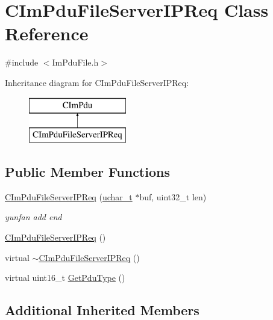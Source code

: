 \hypertarget{class_c_im_pdu_file_server_i_p_req}{}\section{C\+Im\+Pdu\+File\+Server\+I\+P\+Req Class Reference}
\label{class_c_im_pdu_file_server_i_p_req}


{\ttfamily \#include $<$Im\+Pdu\+File.\+h$>$}

Inheritance diagram for C\+Im\+Pdu\+File\+Server\+I\+P\+Req\+:\begin{figure}[H]
\begin{center}
\leavevmode
\includegraphics[height=2.000000cm]{class_c_im_pdu_file_server_i_p_req}
\end{center}
\end{figure}
\subsection*{Public Member Functions}
\begin{DoxyCompactItemize}
\item 
\hyperlink{class_c_im_pdu_file_server_i_p_req_ac28b2d1f56743fc9fbfc0c44260fcb47}{C\+Im\+Pdu\+File\+Server\+I\+P\+Req} (\hyperlink{base_2ostype_8h_a124ea0f8f4a23a0a286b5582137f0b8d}{uchar\+\_\+t} $\ast$buf, uint32\+\_\+t len)
\begin{DoxyCompactList}\small\item\em yunfan add end \end{DoxyCompactList}\item 
\hyperlink{class_c_im_pdu_file_server_i_p_req_a0f66fd9fbb5d7fad464c85bbbca5a2b9}{C\+Im\+Pdu\+File\+Server\+I\+P\+Req} ()
\item 
virtual \hyperlink{class_c_im_pdu_file_server_i_p_req_a767af2351071dd27d95d0e5bb8242cfa}{$\sim$\+C\+Im\+Pdu\+File\+Server\+I\+P\+Req} ()
\item 
virtual uint16\+\_\+t \hyperlink{class_c_im_pdu_file_server_i_p_req_a38cee484beb2334b703536707ce3894f}{Get\+Pdu\+Type} ()
\end{DoxyCompactItemize}
\subsection*{Additional Inherited Members}


